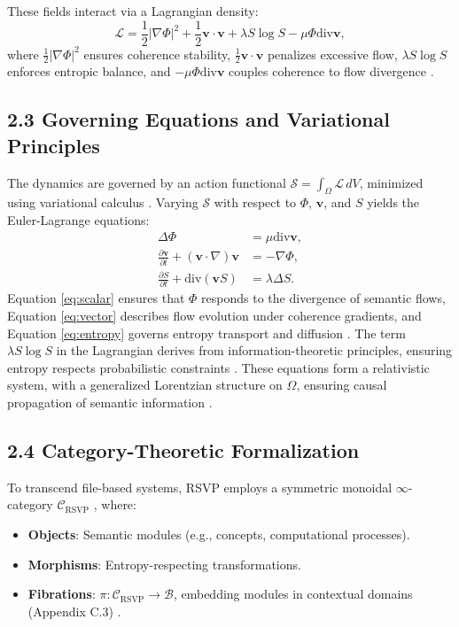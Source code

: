 \documentclass[12pt]{article}
\begin{document}
These fields interact via a Lagrangian density:
\[
\mathcal{L} = \frac{1}{2} |\nabla \Phi|^2 + \frac{1}{2} \mathbf{v} \cdot \mathbf{v} + \lambda S \log S - \mu \Phi \text{div} \mathbf{v},
\]
where \(\frac{1}{2} |\nabla \Phi|^2\) ensures coherence stability, \(\frac{1}{2} \mathbf{v} \cdot \mathbf{v}\) penalizes excessive flow, \(\lambda S \log S\) enforces entropic balance, and \(-\mu \Phi \text{div} \mathbf{v}\) couples coherence to flow divergence \citep{atiyah1969}.

\subsection{2.3 Governing Equations and Variational Principles}

The dynamics are governed by an action functional \(\mathcal{S} = \int_{\Omega} \mathcal{L} \, dV\), minimized using variational calculus \citep{atiyah1969}. Varying \(\mathcal{S}\) with respect to \(\Phi\), \(\mathbf{v}\), and \(S\) yields the Euler-Lagrange equations:
\begin{align}
\Delta \Phi &= \mu \text{div} \mathbf{v}, \label{eq:scalar} \\
\frac{\partial \mathbf{v}}{\partial t} + (\mathbf{v} \cdot \nabla) \mathbf{v} &= -\nabla \Phi, \label{eq:vector} \\
\frac{\partial S}{\partial t} + \text{div} (\mathbf{v} S) &= \lambda \Delta S. \label{eq:entropy}
\end{align}
Equation \eqref{eq:scalar} ensures that \(\Phi\) responds to the divergence of semantic flows, Equation \eqref{eq:vector} describes flow evolution under coherence gradients, and Equation \eqref{eq:entropy} governs entropy transport and diffusion \citep{gromov1999}. The term \(\lambda S \log S\) in the Lagrangian derives from information-theoretic principles, ensuring entropy respects probabilistic constraints \citep{jaynes2003}. These equations form a relativistic system, with a generalized Lorentzian structure on \(\Omega\), ensuring causal propagation of semantic information \citep{baez2011}.

\subsection{2.4 Category-Theoretic Formalization}

To transcend file-based systems, RSVP employs a symmetric monoidal \(\infty\)-category \(\mathcal{C}_{\text{RSVP}}\) \citep{maclane1998}, where:
\begin{itemize}
    \item \textbf{Objects}: Semantic modules (e.g., concepts, computational processes).
    \item \textbf{Morphisms}: Entropy-respecting transformations.
    \item \textbf{Fibrations}: \(\pi: \mathcal{C}_{\text{RSVP}} \to \mathcal{B}\), embedding modules in contextual domains (Appendix C.3) \citep{lawvere2009}.
\end{itemize}
\end{document}
